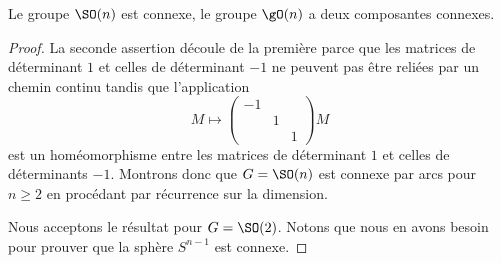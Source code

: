 \begin{theorem}
    Le groupe \( \SO(n)\) est connexe, le groupe \( \gO(n)\) a deux composantes connexes.
\end{theorem}

\begin{proof}
    La seconde assertion découle de la première parce que les matrices de déterminant \( 1\) et celles de déterminant \( -1\) ne peuvent pas être reliées par un chemin continu tandis que l'application
    \begin{equation}
        M\mapsto \begin{pmatrix}
            -1    &       &       \\
                &   1    &       \\
                &       &   1
        \end{pmatrix}M
    \end{equation}
    est un homéomorphisme entre les matrices de déterminant \( 1\) et celles de déterminants \( -1\). Montrons donc que \( G=\SO(n)\) est connexe par arcs pour \( n\geq 2\) en procédant par récurrence sur la dimension.
    
    Nous acceptons le résultat pour $G=\SO(2)$. Notons que nous en avons besoin pour prouver que la sphère \( S^{n-1}\) est connexe.
    

\end{proof}

